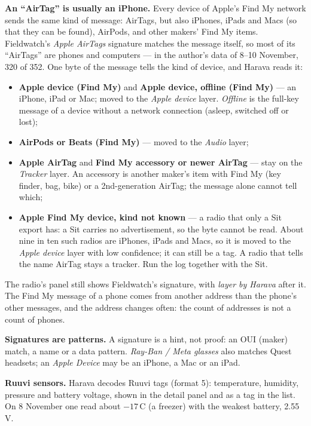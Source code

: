 \documentclass[10pt,a4paper]{article}
\newcommand{\lead}[1]{\textbf{#1}\enspace}           %
\begin{document}
\lead{An ``AirTag'' is usually an iPhone.} Every device of Apple's Find My network sends the same kind of message: AirTags, but also iPhones, iPads and Macs (so that they can be found), AirPods, and other makers' Find My items. Fieldwatch's \emph{Apple AirTags} signature matches the message itself, so most of its ``AirTags'' are phones and computers --- in the author's data of 8--10 November, 320 of 352. One byte of the message tells the kind of device, and Harava reads it:
\begin{itemize}[leftmargin=1.2em]
\item \textbf{Apple device (Find My)} and \textbf{Apple device, offline (Find My)} --- an iPhone, iPad or Mac; moved to the \emph{Apple device} layer. \emph{Offline} is the full-key message of a device without a network connection (asleep, switched off or lost);
\item \textbf{AirPods or Beats (Find My)} --- moved to the \emph{Audio} layer;
\item \textbf{Apple AirTag} and \textbf{Find My accessory or newer AirTag} --- stay on the \emph{Tracker} layer. An accessory is another maker's item with Find My (key finder, bag, bike) or a 2nd-generation AirTag; the message alone cannot tell which;
\item \textbf{Apple Find My device, kind not known} --- a radio that only a Sit export has: a Sit carries no advertisement, so the byte cannot be read. About nine in ten such radios are iPhones, iPads and Macs, so it is moved to the \emph{Apple device} layer with low confidence; it can still be a tag. A radio that tells the name AirTag stays a tracker. Run the log together with the Sit.
\end{itemize}
The radio's panel still shows Fieldwatch's signature, with \emph{layer by Harava} after it. The Find My message of a phone comes from another address than the phone's other messages, and the address changes often: the count of addresses is not a count of phones.

\lead{Signatures are patterns.} A signature is a hint, not proof: an OUI (maker) match, a name or a data pattern. \emph{Ray-Ban / Meta glasses} also matches Quest headsets; an \emph{Apple Device} may be an iPhone, a Mac or an iPad.

\lead{Ruuvi sensors.} Harava decodes Ruuvi tags (format 5): temperature, humidity, pressure and battery voltage, shown in the detail panel and as a tag in the list. On 8 November one read about $-17$\,\textdegree C (a freezer) with the weakest battery, 2.55\,V.
\end{document}
